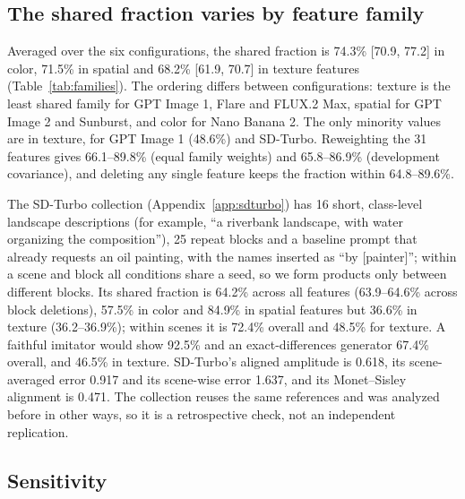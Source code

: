 \documentclass[10pt]{article}
\begin{document}
\subsection{The shared fraction varies by feature family}\label{sec:families}



Averaged over the six configurations, the shared fraction is 74.3\% [70.9, 77.2] in color, 71.5\%
in spatial and 68.2\% [61.9, 70.7] in texture features (Table~\ref{tab:families}). The ordering
differs between configurations: texture is the least shared family for GPT Image 1, Flare and
FLUX.2 Max, spatial for GPT Image 2 and Sunburst, and color for Nano Banana 2. The only minority
values are in texture, for GPT Image 1 (48.6\%) and SD-Turbo. Reweighting the 31 features gives
66.1--89.8\% (equal family weights) and 65.8--86.9\% (development covariance), and deleting any
single feature keeps the fraction within 64.8--89.6\%.

The SD-Turbo collection (Appendix~\ref{app:sdturbo}) has 16 short, class-level landscape
descriptions (for example, ``a riverbank landscape, with water organizing the composition''), 25
repeat blocks and a baseline prompt that already requests an oil painting, with the names inserted
as ``by [painter]''; within a scene and block all conditions share a seed, so we form products only
between different blocks. Its shared fraction is 64.2\% across all features (63.9--64.6\% across
block deletions), 57.5\% in color and 84.9\% in spatial features but 36.6\% in texture
(36.2--36.9\%); within scenes it is 72.4\% overall and 48.5\% for texture. A faithful imitator would
show 92.5\% and an exact-differences generator 67.4\% overall, and 46.5\% in texture. SD-Turbo's
aligned amplitude is 0.618, its scene-averaged error 0.917 and its scene-wise error 1.637, and its
Monet--Sisley alignment is 0.471. The collection reuses the same references and was analyzed before
in other ways, so it is a retrospective check, not an independent replication.

\subsection{Sensitivity}\label{sec:sensitivity}
\end{document}
